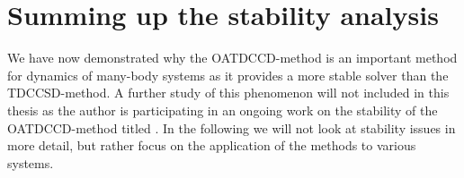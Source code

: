     \section{Summing up the stability analysis}
        We have now demonstrated why the OATDCCD-method is an important method
        for dynamics of many-body systems as it provides a more stable solver
        than the TDCCSD-method.
        A further study of this phenomenon will not included in this thesis as
        the author is participating in an ongoing work on the stability of the
        OATDCCD-method titled  \cite{oa-stability}.
        In the following we will not look at stability issues in more detail,
        but rather focus on the application of the methods to various systems.




\clearemptydoublepage
